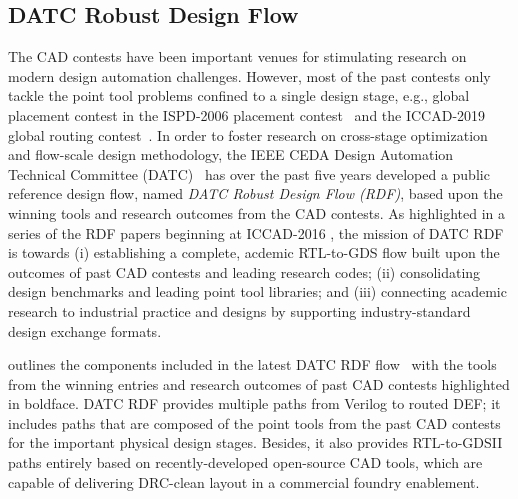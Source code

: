 \subsection{DATC Robust Design Flow}

The CAD contests have been important venues for stimulating research on modern design automation challenges.
However, most of the past contests only tackle the point tool problems confined to a single design stage, e.g., global placement contest in the ISPD-2006 placement contest~\cite{nam:2006is} and the ICCAD-2019 global routing contest~\cite{dolgov:2019ca}.
In order to foster research on cross-stage optimization and flow-scale design methodology, the IEEE CEDA Design Automation Technical Committee (DATC)~\cite{ieee-datc} has over the past five years developed a public reference design flow, named \textit{DATC Robust Design Flow (RDF)}, based upon the winning tools and research outcomes from the CAD contests.
As highlighted in a series of the RDF papers beginning at ICCAD-2016 \cite{jung:2016od,jung:2017dr,jung:2018dr,jung:2018drod,chen:2019da,chen:2020da}, the mission of DATC RDF is towards (i) establishing a complete, acdemic RTL-to-GDS flow built upon the outcomes of past CAD contests and leading research codes; (ii) consolidating design benchmarks and leading point tool libraries; and (iii) connecting academic research to industrial practice and designs by supporting industry-standard design exchange formats.  

 outlines the components included in the latest DATC RDF flow~\cite{chen:2020da} with the tools from the winning entries and research outcomes of past CAD contests highlighted in boldface.
DATC RDF provides multiple paths from Verilog to routed DEF; it includes paths that are composed of the point tools from the past CAD contests for the important physical design stages. 
Besides, it also provides RTL-to-GDSII paths entirely based on recently-developed open-source CAD tools, which are capable of delivering DRC-clean layout in a commercial foundry enablement.


